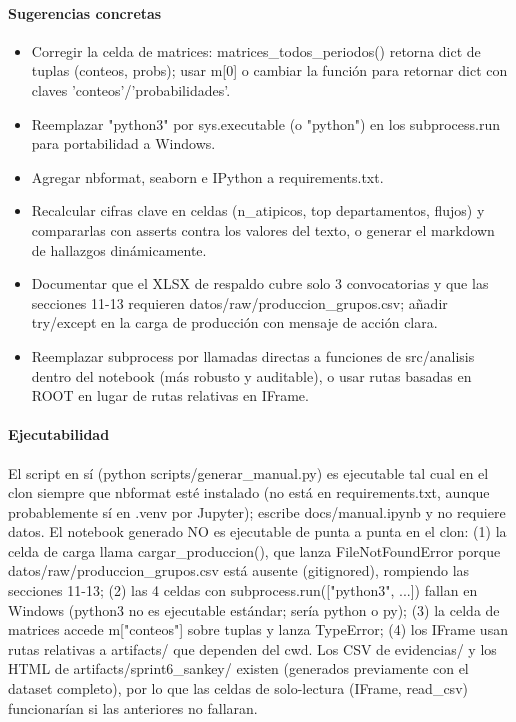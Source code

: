 \paragraph{Sugerencias concretas}
\begin{itemize}
  \item Corregir la celda de matrices: matrices\_todos\_periodos() retorna dict de tuplas (conteos, probs); usar m[0] o cambiar la función para retornar dict con claves 'conteos'/'probabilidades'.
  \item Reemplazar "python3" por sys.executable (o "python") en los subprocess.run para portabilidad a Windows.
  \item Agregar nbformat, seaborn e IPython a requirements.txt.
  \item Recalcular cifras clave en celdas (n\_atipicos, top departamentos, flujos) y compararlas con asserts contra los valores del texto, o generar el markdown de hallazgos dinámicamente.
  \item Documentar que el XLSX de respaldo cubre solo 3 convocatorias y que las secciones 11-13 requieren datos/raw/produccion\_grupos.csv; añadir try/except en la carga de producción con mensaje de acción clara.
  \item Reemplazar subprocess por llamadas directas a funciones de src/analisis dentro del notebook (más robusto y auditable), o usar rutas basadas en ROOT en lugar de rutas relativas en IFrame.
\end{itemize}

\paragraph{Ejecutabilidad}
El script en sí (python scripts/generar\_manual.py) es ejecutable tal cual en el clon siempre que nbformat esté instalado (no está en requirements.txt, aunque probablemente sí en .venv por Jupyter); escribe docs/manual.ipynb y no requiere datos. El notebook generado NO es ejecutable de punta a punta en el clon: (1) la celda de carga llama cargar\_produccion(), que lanza FileNotFoundError porque datos/raw/produccion\_grupos.csv está ausente (gitignored), rompiendo las secciones 11-13; (2) las 4 celdas con subprocess.run(["python3", ...]) fallan en Windows (python3 no es ejecutable estándar; sería python o py); (3) la celda de matrices accede m["conteos"] sobre tuplas y lanza TypeError; (4) los IFrame usan rutas relativas a artifacts/ que dependen del cwd. Los CSV de evidencias/ y los HTML de artifacts/sprint6\_sankey/ existen (generados previamente con el dataset completo), por lo que las celdas de solo-lectura (IFrame, read\_csv) funcionarían si las anteriores no fallaran.

